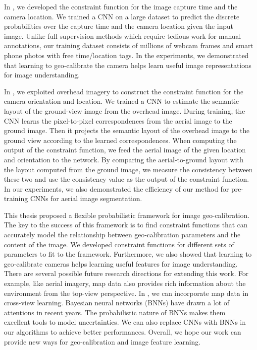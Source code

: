In , we developed the constraint function for 
the image capture time and the camera location. 
We trained a CNN on a large dataset to predict the discrete
probabilities over the capture time and the camera location given the
input image.
Unlike full supervision methods which require tedious work for manual
annotations, our training dataset consists of millions of webcam
frames and smart phone photos with free time/location tags.
In the experiments, we demonstrated that learning to geo-calibrate the
camera helps learn useful image representations for image understanding.

In , we exploited overhead imagery to construct
the constraint function for the camera orientation and location.
We trained a CNN to estimate the semantic layout of the
ground-view image from the overhead image. During training, the CNN
learns the pixel-to-pixel correspondences from the aerial image to the
ground image. Then it projects the semantic layout of the overhead
image to the ground view according to the learned correspondences.
When computing the output of the constraint function, we feed the
aerial image of the given location and orientation to the network. By
comparing the aerial-to-ground layout with the layout computed from
the ground image, we measure the consistency between these two and use
the consistency value as the output of the constraint function. 
In our experiments, we also demonstrated the efficiency of our method
for pre-training CNNs for aerial image segmentation.

This thesis proposed a flexible probabilistic framework for image
geo-calibration. The key to the success of this framework is to find
constraint functions that can accurately model the relationship between
geo-calibration parameters and the content of the image. 
We developed constraint functions for different sets of parameters to
fit to the framework. 
Furthermore, we also showed that learning to geo-calibrate cameras helps
learning useful features for image understanding. 
%
There are several possible future research directions for extending
this work. For example, like aerial imagery, map data also
provides rich information about the environment from the top-view
perspective. In , we can incorporate map data in
cross-view learning.
%
Bayesian neural networks (BNNs) have drawn a lot
of attentions in recent years. The probabilistic nature of BNNs makes
them excellent tools to model uncertainties. We can also replace CNNs
with BNNs in our algorithms to achieve better performances.
Overall, we hope our work can provide new ways for
geo-calibration and image feature learning.
